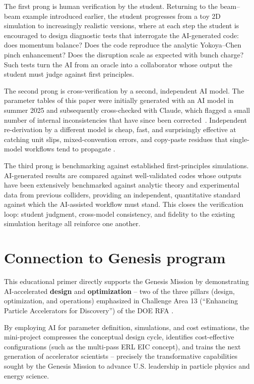 \documentclass[%
               refpage,       %
               biblatex,     %
               hyphens,      %
               ]{jacow}
\begin{document}
The first prong is human verification by the student. Returning to the beam--beam example introduced earlier, the student progresses from a toy 2D simulation to increasingly realistic versions, where at each step the student is encouraged to design diagnostic tests that interrogate the AI-generated code: does momentum balance? Does the code reproduce the analytic Yokoya--Chen pinch enhancement? Does the disruption scale as expected with bunch charge? Such tests turn the AI from an oracle into a collaborator whose output the student must judge against first principles. 

The second prong is cross-verification by a second, independent AI model. The parameter tables of this paper were initially generated with an AI model in summer 2025 and subsequently cross-checked with Claude, which flagged a small number of internal inconsistencies that have since been corrected~\cite{pars-verification}. Independent re-derivation by a different model is cheap, fast, and surprisingly effective at catching unit slips, mixed-convention errors, and copy-paste residues that single-model workflows tend to propagate \cite{arbuzov2026beyond,gan2025rethinking}.

The third prong is benchmarking against established first-principles simulations. AI-generated results are compared against well-validated codes whose outputs have been extensively benchmarked against analytic theory and experimental data from previous colliders, providing an independent, quantitative standard against which the AI-assisted workflow must stand. This closes the verification loop: student judgment, cross-model consistency, and fidelity to the existing simulation heritage all reinforce one another.


\section{Connection to Genesis program}

This educational primer directly supports the Genesis Mission by demonstrating AI-accelerated  \textbf{design} and \textbf{optimization} -- two of the three pillars (design, optimization, and operations) emphasized in Challenge Area 13 (``Enhancing Particle Accelerators for Discovery'') of the DOE RFA \cite{Genesis-RFA}. 

By employing AI for parameter definition,  simulations, and cost estimations, the mini-project compresses the conceptual design cycle, identifies cost-effective configurations (such as the multi-pass ERL EIC concept), and trains the next generation of accelerator scientists -- precisely the transformative capabilities sought by the Genesis Mission to advance U.S. leadership in particle physics and energy science.
\end{document}
